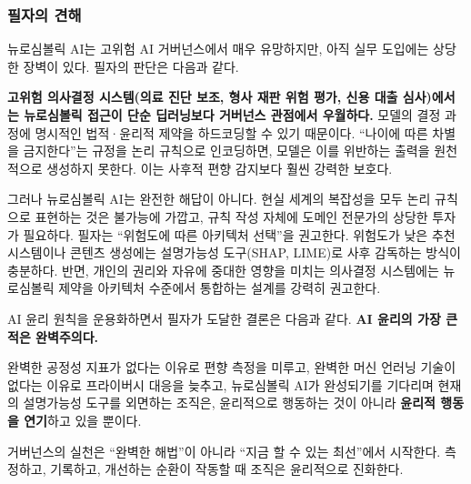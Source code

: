 \subsubsection*{필자의 견해}

뉴로심볼릭 AI는 고위험 AI 거버넌스에서 매우 유망하지만, 아직 실무 도입에는 상당한 장벽이 있다. 필자의 판단은 다음과 같다.

\textbf{고위험 의사결정 시스템(의료 진단 보조, 형사 재판 위험 평가, 신용 대출 심사)에서는 뉴로심볼릭 접근이 단순 딥러닝보다 거버넌스 관점에서 우월하다.} 모델의 결정 과정에 명시적인 법적·윤리적 제약을 하드코딩할 수 있기 때문이다. ``나이에 따른 차별을 금지한다''는 규정을 논리 규칙으로 인코딩하면, 모델은 이를 위반하는 출력을 원천적으로 생성하지 못한다. 이는 사후적 편향 감지보다 훨씬 강력한 보호다.

그러나 뉴로심볼릭 AI는 완전한 해답이 아니다. 현실 세계의 복잡성을 모두 논리 규칙으로 표현하는 것은 불가능에 가깝고, 규칙 작성 자체에 도메인 전문가의 상당한 투자가 필요하다. 필자는 ``위험도에 따른 아키텍처 선택''을 권고한다. 위험도가 낮은 추천 시스템이나 콘텐츠 생성에는 설명가능성 도구(SHAP, LIME)로 사후 감독하는 방식이 충분하다. 반면, 개인의 권리와 자유에 중대한 영향을 미치는 의사결정 시스템에는 뉴로심볼릭 제약을 아키텍처 수준에서 통합하는 설계를 강력히 권고한다.

\begin{tcolorbox}[colback=blue!5!white, colframe=blue!75!black, title={\textbf{저자 총평: AI 윤리의 ``불편한 진실''}}]
AI 윤리 원칙을 운용화하면서 필자가 도달한 결론은 다음과 같다. \textbf{AI 윤리의 가장 큰 적은 완벽주의다.}

완벽한 공정성 지표가 없다는 이유로 편향 측정을 미루고, 완벽한 머신 언러닝 기술이 없다는 이유로 프라이버시 대응을 늦추고, 뉴로심볼릭 AI가 완성되기를 기다리며 현재의 설명가능성 도구를 외면하는 조직은, 윤리적으로 행동하는 것이 아니라 \textbf{윤리적 행동을 연기}하고 있을 뿐이다.

거버넌스의 실천은 ``완벽한 해법''이 아니라 ``지금 할 수 있는 최선''에서 시작한다. 측정하고, 기록하고, 개선하는 순환이 작동할 때 조직은 윤리적으로 진화한다.
\end{tcolorbox}
